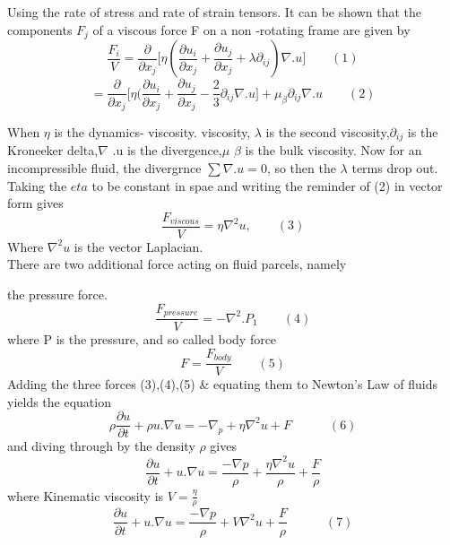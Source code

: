 \documentclass[a4paper, 12pt]{report}
\begin{document}
Using the rate of stress and rate of strain tensors. It can be shown that the components $F_j$ of a viscous force F on a non -rotating frame are given by \newline
\begin{equation*}
	\frac{F_i}{V}=\frac{\partial}{\partial x_j}\bigg[\eta\left(\frac{\partial u_i}{\partial x_j} +\frac{\partial u_j}{\partial x_j}+\lambda \partial_{ij}\right)\nabla .u\bigg]\quad \quad (1)
\end{equation*}
\begin{equation*}
	=\frac{\partial}{\partial x_j}\bigg[\eta(\frac{\partial u_i}{\partial x_j} +\frac{\partial u_j}{\partial x_j}-\frac{2}{3}\partial_{ij}\nabla .u\bigg]+\mu_\beta\partial_{ij}\nabla .u \quad \quad (2)
\end{equation*}


	When $\eta$ is the dynamics- viscosity. viscosity, $\lambda$ is the second viscosity,$\partial_{ij}$ is the Kroneeker delta,{$\nabla$ .u} is the divergence,$\mu$ $\beta$ is the bulk viscosity.\newline
Now for an incompressible fluid, the divergrnce $\sum\nabla .u=0$, so then the $\lambda$ terms drop out. Taking the $eta$ to be constant in spae and writing the reminder of (2) in vector form gives 
\begin{equation*}
	\frac{F_{viscous}}{V}=\eta\nabla^2 u,\quad \quad (3)
\end{equation*} 
Where $\nabla^2 u$ is the vector Laplacian.\\
There are two additional force acting on fluid parcels, namely

the pressure force.
\begin{equation*}
	\frac{F_{pressure}}{V}=-\nabla^2.P_1 \quad \quad (4)
\end{equation*}
where P is the pressure, and so called body force
\begin{equation*}
	F=\frac{F_{body}}{V}\quad \quad (5)
\end{equation*}
Adding the three forces (3),(4),(5) \& equating them to Newton's  Law of fluids yields the equation
\begin{equation*}
	\rho \frac{\partial u}{\partial t}+\rho u.\nabla u=-\nabla_p +\eta\nabla^2 u + F \quad \quad \quad (6)
\end{equation*} 
and diving through by the density $\rho$ gives
\begin{equation*}
	\frac{\partial u}{\partial t}+u.\nabla u=\frac{-\nabla p}{\rho}+\frac{\eta\nabla^2u}{\rho}+\frac{F}{\rho}
\end{equation*}
where Kinematic viscosity is $V=\frac{\eta}{\rho}$
\begin{equation}
	\frac{\partial u}{\partial t}+u.\nabla u=\frac{-\nabla p}{\rho}+V\nabla^2u+\frac{F}{\rho}\quad \quad \quad (7)
\end{equation}
\end{document}
